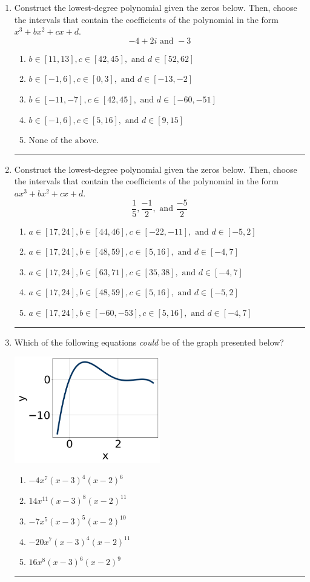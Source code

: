 \documentclass[14pt]{extbook}
\newcommand{\litem}[1]{\item#1\hspace*{-1cm}\rule{\textwidth}{0.4pt}}
\begin{document}
\begin{enumerate}
\litem{
Construct the lowest-degree polynomial given the zeros below. Then, choose the intervals that contain the coefficients of the polynomial in the form $x^3+bx^2+cx+d$.\[ -4 + 2 i \text{ and } -3 \]\begin{enumerate}[label=\Alph*.]
\item \( b \in [11, 13], c \in [42, 45], \text{ and } d \in [52, 62] \)
\item \( b \in [-1, 6], c \in [0, 3], \text{ and } d \in [-13, -2] \)
\item \( b \in [-11, -7], c \in [42, 45], \text{ and } d \in [-60, -51] \)
\item \( b \in [-1, 6], c \in [5, 16], \text{ and } d \in [9, 15] \)
\item \( \text{None of the above.} \)

\end{enumerate} }
\litem{
Construct the lowest-degree polynomial given the zeros below. Then, choose the intervals that contain the coefficients of the polynomial in the form $ax^3+bx^2+cx+d$.\[ \frac{1}{5}, \frac{-1}{2}, \text{ and } \frac{-5}{2} \]\begin{enumerate}[label=\Alph*.]
\item \( a \in [17, 24], b \in [44, 46], c \in [-22, -11], \text{ and } d \in [-5, 2] \)
\item \( a \in [17, 24], b \in [48, 59], c \in [5, 16], \text{ and } d \in [-4, 7] \)
\item \( a \in [17, 24], b \in [63, 71], c \in [35, 38], \text{ and } d \in [-4, 7] \)
\item \( a \in [17, 24], b \in [48, 59], c \in [5, 16], \text{ and } d \in [-5, 2] \)
\item \( a \in [17, 24], b \in [-60, -53], c \in [5, 16], \text{ and } d \in [-4, 7] \)

\end{enumerate} }
\litem{
Which of the following equations \textit{could} be of the graph presented below?
\begin{center}
    \includegraphics[width=0.5\textwidth]{../Figures/polyGraphToFunctionB.png}
\end{center}
\begin{enumerate}[label=\Alph*.]
\item \( -4x^{7} (x - 3)^{4} (x - 2)^{6} \)
\item \( 14x^{11} (x - 3)^{8} (x - 2)^{11} \)
\item \( -7x^{5} (x - 3)^{5} (x - 2)^{10} \)
\item \( -20x^{7} (x - 3)^{4} (x - 2)^{11} \)
\item \( 16x^{8} (x - 3)^{6} (x - 2)^{9} \)


\end{enumerate}}
\end{enumerate}
\end{document}
